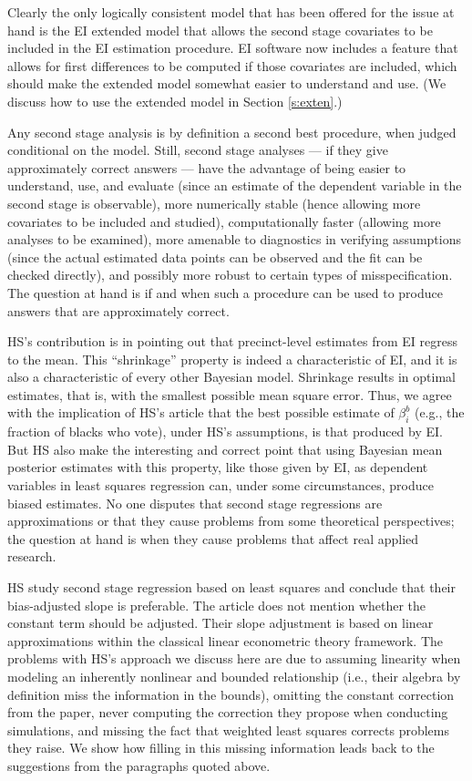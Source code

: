 \documentclass[11pt,titlepage]{article}
\begin{document}
Clearly the only logically consistent model that has been offered for
the issue at hand is the EI extended model that allows the second
stage covariates to be included in the EI estimation procedure.  EI
software now includes a feature that allows for first differences to
be computed if those covariates are included, which should make the
extended model somewhat easier to understand and use.  (We discuss how
to use the extended model in Section \ref{s:exten}.)

Any second stage analysis is by definition a second best
procedure, when judged conditional on the model.  Still, second
stage analyses --- if they give approximately correct answers --- have
the advantage of being easier to understand, use, and evaluate (since
an estimate of the dependent variable in the second stage is
observable), more numerically stable (hence allowing more covariates
to be included and studied), computationally faster (allowing more
analyses to be examined), more amenable to diagnostics in verifying
assumptions (since the actual estimated data points can be observed
and the fit can be checked directly), and possibly more robust to
certain types of misspecification.  The question at hand is if and
when such a procedure can be used to produce answers that are
approximately correct.

HS's contribution is in pointing out that precinct-level estimates
from EI regress to the mean.  This ``shrinkage'' property is indeed a
characteristic of EI, and it is also a characteristic of every other
Bayesian model.  Shrinkage results in optimal estimates, that is, with
the smallest possible mean square error.  Thus, we agree with the
implication of HS's article that the best possible estimate of
$\beta_i^b$ (e.g., the fraction of blacks who vote), under HS's
assumptions, is that produced by EI.  But HS also make the interesting
and correct point that using Bayesian mean posterior estimates with
this property, like those given by EI, as dependent variables in least
squares regression can, under some circumstances, produce biased
estimates.  No one disputes that second stage regressions are
approximations or that they cause problems from some theoretical
perspectives; the question at hand is when they cause problems that
affect real applied research.

HS study second stage regression based on least squares and conclude
that their bias-adjusted slope is preferable.  The article does not
mention whether the constant term should be adjusted.  Their slope
adjustment is based on linear approximations within the classical
linear econometric theory framework.  The problems with HS's approach
we discuss here are due to assuming linearity when modeling an
inherently nonlinear and bounded relationship (i.e., their algebra by
definition miss the information in the bounds), omitting the constant
correction from the paper, never computing the correction they propose
when conducting simulations, and missing the fact that weighted least
squares corrects problems they raise.  We show how filling in this
missing information leads back to the suggestions from the paragraphs
quoted above.
\end{document}
